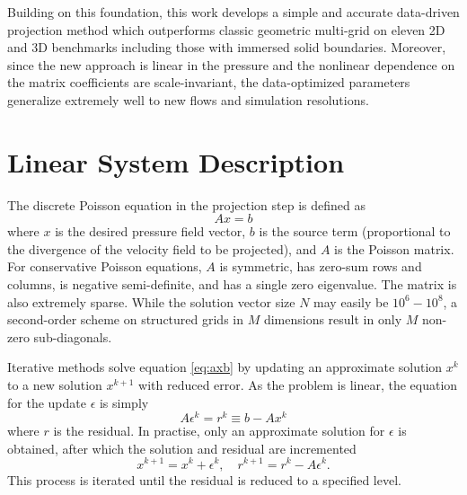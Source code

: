 \documentclass[review]{elsarticle}
\begin{document}
Building on this foundation, this work develops a simple and accurate data-driven projection method which outperforms classic geometric multi-grid on eleven 2D and 3D benchmarks including those with immersed solid boundaries. Moreover, since the new approach is linear in the pressure and the nonlinear dependence on the matrix coefficients are scale-invariant, the data-optimized parameters generalize extremely well to new flows and simulation resolutions.

\section{Linear System Description}

The discrete Poisson equation in the projection step is defined as
\begin{equation}\label{eq:axb}
    A x = b
\end{equation}
where $x$ is the desired pressure field vector, $b$ is the source term (proportional to the divergence of the velocity field to be projected), and $A$ is the Poisson matrix. For conservative Poisson equations, $A$ is symmetric, has zero-sum rows and columns, is negative semi-definite, and has a single zero eigenvalue. The matrix is also extremely sparse. While the solution vector size $N$ may easily be $10^6-10^8$, a second-order scheme on structured grids in $M$ dimensions result in only $M$ non-zero sub-diagonals.

Iterative methods solve equation \ref{eq:axb} by updating an approximate solution $x^k$ to a new solution $x^{k+1}$ with reduced error. As the problem is linear, the equation for the update $\epsilon$ is simply
\begin{equation}\label{eq:aer} 
    A \epsilon^k = r^k \equiv b - Ax^k
\end{equation}
where $r$ is the residual. In practise, only an approximate solution for $\epsilon$ is obtained, after which the solution and residual are incremented
\begin{equation}\label{eq:increment}
    x^{k+1} = x^k+\epsilon^k, \quad r^{k+1} = r^k-A\epsilon^k.
\end{equation}
This process is iterated until the residual is reduced to a specified level.
\end{document}
